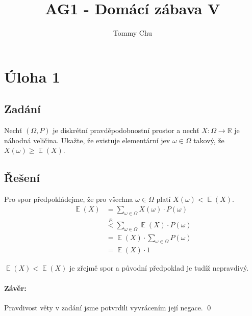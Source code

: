 \documentclass[a4paper]{article}
\title{AG1 - Domácí zábava V}
\author{Tommy Chu}
\date{}
\DeclareMathOperator{\E}{\mathbb{E}}
\begin{document}
\maketitle

\section*{Úloha 1}

\subsection*{Zadání}
Nechť ${(\Omega, P)}$ je diskrétní pravděpodobnostní prostor a nechť ${X \colon \Omega \rightarrow \mathbb{R}}$ je náhodná veličina. Ukažte, že existuje elementární jev ${\omega \in \Omega}$ takový, že ${X(\omega) \ge \E(X)}$.

\subsection*{Řešení}

Pro spor předpokládejme, že pro všechna ${\omega \in \Omega}$ platí ${X(\omega) < \E(X)}$.
\begin{align*}
    \E(X) & = \sum_{\omega \in \Omega} X(\omega) \cdot P(\omega)            \\
          & \stackrel{P.}{<} \sum_{\omega \in \Omega} \E(X) \cdot P(\omega) \\
          & = \E(X) \cdot \sum_{\omega \in \Omega} P(\omega)                \\
          & = \E(X) \cdot 1
\end{align*}

$\E(X) < \E(X)$ je zřejmě spor a původní předpoklad je tudíž nepravdivý.

\paragraph*{Závěr:} Pravdivost věty v zadání jsme potvrdili vyvrácením její negace.
\qed
\end{document}
